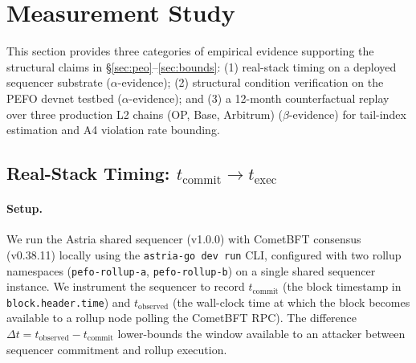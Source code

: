 %
%

\section{Measurement Study}
\label{sec:meas}

This section provides three categories of empirical evidence supporting the
structural claims in \S\ref{sec:peo}--\ref{sec:bounds}:
(1) real-stack timing on a deployed sequencer substrate ($\alpha$-evidence);
(2) structural condition verification on the PEFO devnet testbed ($\alpha$-evidence);
and (3) a 12-month counterfactual replay over three production L2 chains (OP, Base, Arbitrum)
($\beta$-evidence) for tail-index estimation and A4 violation rate bounding.

\subsection{Real-Stack Timing: $t_{\mathrm{commit}} \to t_{\mathrm{exec}}$}
\label{sec:meas-timing}

\paragraph{Setup.}
We run the Astria shared sequencer (v1.0.0) with CometBFT consensus (v0.38.11)
locally using the \texttt{astria-go dev run} CLI, configured with two rollup
namespaces (\texttt{pefo-rollup-a}, \texttt{pefo-rollup-b}) on a single
shared sequencer instance. We instrument the sequencer to record
$t_{\mathrm{commit}}$ (the block timestamp in \texttt{block.header.time})
and $t_{\mathrm{observed}}$ (the wall-clock time at which the block becomes
available to a rollup node polling the CometBFT RPC). The difference
$\Delta t = t_{\mathrm{observed}} - t_{\mathrm{commit}}$ lower-bounds the
window available to an attacker between sequencer commitment and rollup
execution.

